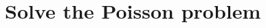 
\begin{comment}
From: Fande Kong <fdkong.jd@gmail.com>
To: PETSc users list <petsc-users@mcs.anl.gov>
Subject: Re: [petsc-users] Status on parallel mesh reader in DMPlex
> Message: 2
>Date: Fri, 18 Dec 2015 08:21:04 -0800
>From: Justin Chang <jychang48@gmail.com>
>To: petsc-users <petsc-users@mcs.anl.gov>
>Subject: [petsc-users] Status on parallel mesh reader in DMPlex

> Hi all,

>What's the status on the implementation of the parallel

I am actually developing a parallel loader. The loader has two steps:

(1) Use 1 core or several cores to read a sequential  mesh, and partition
it into $np$ parts using a partitioner, $np$ is the number of cores you
want to use to do a simulation. Usually, $np$ is large, for example, 10,000
cores. And then we write the partitioned data into the file system as a
HDF5 file.

(2) Load the partitioned data (HDF5 file) into $np$ cores in parallel.

This idea works pretty well for me at this point.  But, this loader is
not compatible with DMPlex now. However, I could change the code somehow,
If this idea is acceptable.

You could also implement it by yourself. It is not too bad.

>mesh reader/generator for DMPlex meshes? Is anyone actively working on
> this? If so is there a branch that I can peek into?

Parallel generator is highly nontrivial, I think. It is a very hard topic.

> Thanks,
> Justin
\end{comment}


\section{Solve the Poisson problem}

